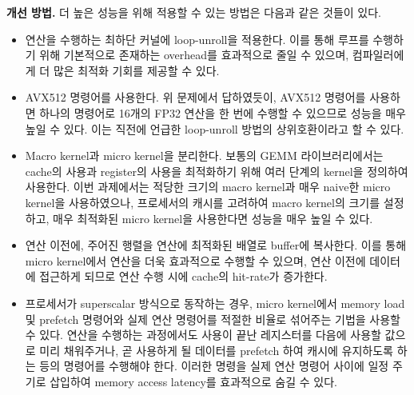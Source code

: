 \begin{itemize}
{        \textbf{개선 방법.}
        더 높은 성능을 위해 적용할 수 있는 방법은 다음과 같은 것들이 있다.
        \begin{itemize}
            \item {
                연산을 수행하는 최하단 커널에 loop-unroll을 적용한다. 이를 통해 루프를 수행하기 위해
                기본적으로 존재하는 overhead를 효과적으로 줄일 수 있으며, 컴파일러에게 더 많은
                최적화 기회를 제공할 수 있다.
            }
            \item {
                AVX512 명령어를 사용한다. 위 문제에서 답하였듯이, AVX512 명령어를 사용하면 하나의
                명령어로 16개의 FP32 연산을 한 번에 수행할 수 있으므로 성능을 매우 높일 수 있다.
                이는 직전에 언급한 loop-unroll 방법의 상위호환이라고 할 수 있다.
            }
            \item {
                Macro kernel과 micro kernel을 분리한다. 보통의 GEMM 라이브러리에서는 cache의 사용과
                register의 사용을 최적화하기 위해 여러 단계의 kernel을 정의하여 사용한다.
                이번 과제에서는 적당한 크기의 macro kernel과 매우 naive한 micro kernel을
                사용하였으나, 프로세서의 캐시를 고려하여 macro kernel의 크기를 설정하고,
                매우 최적화된 micro kernel을 사용한다면 성능을 매우 높일 수 있다.
            }
            \item {
                연산 이전에, 주어진 행렬을 연산에 최적화된 배열로 buffer에 복사한다.
                이를 통해 micro kernel에서 연산을 더욱 효과적으로 수행할 수 있으며,
                연산 이전에 데이터에 접근하게 되므로 연산 수행 시에 cache의 hit-rate가 증가한다.
            }
            \item {
                프로세서가 superscalar 방식으로 동작하는 경우, micro kernel에서 memory load 및
                prefetch 명령어와 실제 연산 명령어를 적절한 비율로 섞어주는 기법을 사용할 수 있다.
                연산을 수행하는 과정에서도 사용이 끝난 레지스터를 다음에 사용할 값으로 미리 채워주거나,
                곧 사용하게 될 데이터를 prefetch 하여 캐시에 유지하도록 하는 등의 명령어를 수행해야 한다.
                이러한 명령을 실제 연산 명령어 사이에 일정 주기로 삽입하여 memory access latency를
                효과적으로 숨길 수 있다.
            }
        \end{itemize}
        
    }
    
\end{itemize}